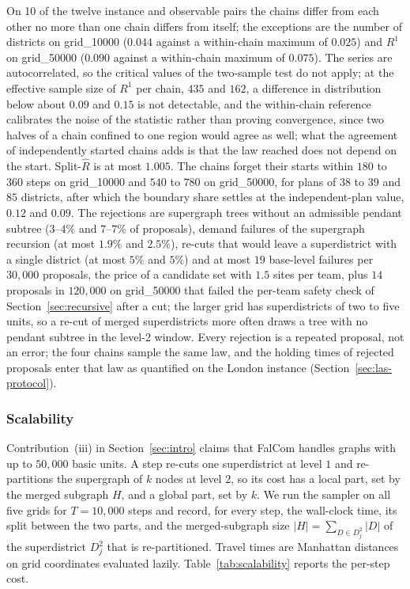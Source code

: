 \documentclass[preprint,12pt,authoryear]{elsarticle}
\theoremstyle{definition}
\begin{document}
On 10 of the twelve instance and observable pairs the chains differ from each other no more than one chain differs from itself; the exceptions are the number of districts on grid\_10000 ($0.044$ against a within-chain maximum of $0.025$) and $R^1$ on grid\_50000 ($0.090$ against a within-chain maximum of $0.075$). The series are autocorrelated, so the critical values of the two-sample test do not apply; at the effective sample size of $R^1$ per chain, $435$ and $162$, a difference in distribution below about $0.09$ and $0.15$ is not detectable, and the within-chain reference calibrates the noise of the statistic rather than proving convergence, since two halves of a chain confined to one region would agree as well; what the agreement of independently started chains adds is that the law reached does not depend on the start. Split-$\hat R$ is at most $1.005$. The chains forget their starts within $180$ to $360$ steps on grid\_10000 and $540$ to $780$ on grid\_50000, for plans of $38$ to $39$ and $85$ districts, after which the boundary share settles at the independent-plan value, $0.12$ and $0.09$. The rejections are supergraph trees without an admissible pendant subtree ($3$--$4\%$ and $7$--$7\%$ of proposals), demand failures of the supergraph recursion (at most $1.9\%$ and $2.5\%$), re-cuts that would leave a superdistrict with a single district (at most $5\%$ and $5\%$) and at most $19$ base-level failures per $30{,}000$ proposals, the price of a candidate set with $1.5$ sites per team, plus $14$ proposals in $120{,}000$ on grid\_50000 that failed the per-team safety check of Section~\ref{sec:recursive} after a cut; the larger grid has superdistricts of two to five units, so a re-cut of merged superdistricts more often draws a tree with no pendant subtree in the level-2 window. Every rejection is a repeated proposal, not an error; the four chains sample the same law, and the holding times of rejected proposals enter that law as quantified on the London instance (Section~\ref{sec:las-protocol}).

\FloatBarrier
\subsubsection{Scalability}\label{sec:exp-scalability}

Contribution~(iii) in Section~\ref{sec:intro} claims that FalCom handles graphs with up to $50{,}000$ basic units. A step re-cuts one superdistrict at level $1$ and re-partitions the supergraph of $k$ nodes at level $2$, so its cost has a local part, set by the merged subgraph $H$, and a global part, set by $k$. We run the sampler on all five grids for $T = 10{,}000$ steps and record, for every step, the wall-clock time, its split between the two parts, and the merged-subgraph size $|H| = \sum_{D \in D^2_j} |D|$ of the superdistrict $D^2_j$ that is re-partitioned. Travel times are Manhattan distances on grid coordinates evaluated lazily. Table~\ref{tab:scalability} reports the per-step cost.
\end{document}
